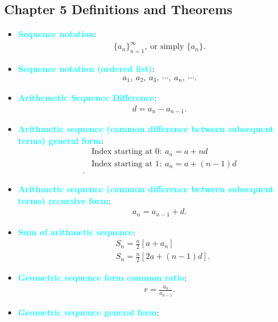 \documentclass{report}
\begin{document}
\subsection{Chapter 5 Definitions and Theorems}
\bigbreak \noindent 
\begin{itemize}
    \item \textbf{\textcolor{cyan}{Sequence notation}}:
        \begin{align*}
            \{a_{n}\}_{n=1}^{\infty},\ \text{or simply } \{a_{n}\}
        .\end{align*}
    \item \textbf{\textcolor{cyan}{Sequence notation (ordered list)}}:
        \begin{align*}
            a_{1},\ a_{2},\ a_{3},\ \cdots,\ a_{n},\ \cdots
        .\end{align*}
    \item \textbf{\textcolor{cyan}{Arithemetic Sequence Difference}}:
        \begin{align*}
            d = a_{n} - a_{n-1}
        .\end{align*}
    \item \textbf{\textcolor{cyan}{Arithmetic sequence (common difference between subsequent terms) general form}}:
        \begin{align*}
            &\text{Index starting at 0}:\ a_{n} = a + nd \\
            &\text{Index starting at 1}:\ a_{n} = a + (n-1)d \\
        .\end{align*}
    \item \textbf{\textcolor{cyan}{Arithmetic sequence (common difference between subsequent terms) recursive form}}:
        \begin{align*}
            a_{n} = a_{n-1} + d
        .\end{align*}
    \item \textbf{\textcolor{cyan}{Sum of arithmetic sequence}}:
        \begin{align*}
            &S_{n} = \frac{n}{2}\left[a + a_{n}\right] \\
            &S_{n} = \frac{n}{2}\left[2a + (n-1)d\right]
        .\end{align*}
    \item \textbf{\textcolor{cyan}{Geometric sequence form common ratio}}:
        \begin{align*}
            r = \frac{a_{n}}{a_{n-1}}
        .\end{align*}
    \item \textbf{\textcolor{cyan}{Geometric sequence general form}}:

\end{itemize}
\end{document}
